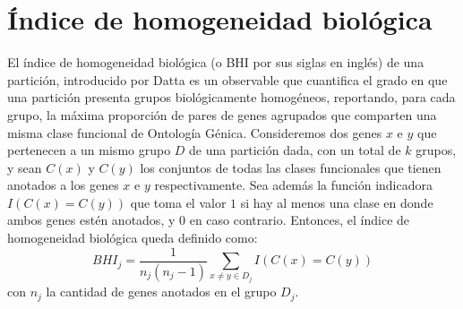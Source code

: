 \section{Índice de homogeneidad biológica}
El índice de homogeneidad biológica (o BHI por sus siglas en inglés) de una partición, introducido por Datta \cite{Datta2006} es un observable que cuantifica el grado en que una partición presenta grupos biológicamente homogéneos, reportando, para cada grupo, la máxima proporción de pares de genes agrupados que comparten una misma clase funcional de Ontología Génica. Consideremos dos genes $x$ e $y$ que pertenecen a un mismo grupo $D$ de una partición dada, con un total de $k$ grupos, y sean $C(x)$ y $C(y)$ los conjuntos de todas las clases funcionales que tienen anotados a los genes $x$ e $y$ respectivamente. Sea además la función indicadora $I(C(x)=C(y))$ que toma el valor $1$ si hay al menos una clase en donde ambos genes estén anotados, y $0$ en caso contrario. Entonces, el índice de homogeneidad biológica queda definido como:
\begin{equation}
	BHI_j = \frac{1}{n_j(n_j-1)}\sum\limits_{x\neq y\in D_j}I(C(x)=C(y))
\end{equation}
con $n_j$ la cantidad de genes anotados en el grupo $D_j$.\\\\

